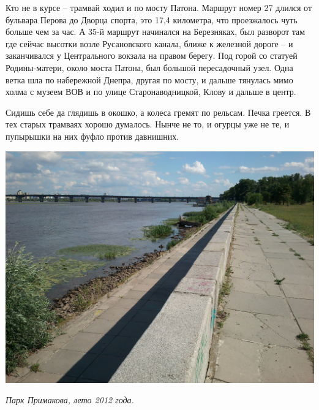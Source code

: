 Кто не в курсе – трамвай ходил и по мосту Патона. Маршрут номер 27 длился от бульвара Перова до Дворца спорта, это 17,4 километра, что проезжалось чуть больше чем за час. А 35-й маршрут начинался на Березняках, был разворот там где сейчас высотки возле Русановского канала, ближе к железной дороге – и заканчивался у Центрального вокзала на правом берегу. Под горой со статуей Родины-матери, около моста Патона, был большой пересадочный узел. Одна ветка шла по набережной Днепра, другая по мосту, и дальше тянулась мимо холма с музеем ВОВ и по улице Старонаводницкой, Клову и дальше в центр.

Сидишь себе да глядишь в окошко, а колеса гремят по рельсам. Печка греется. В тех старых трамваях хорошо думалось. Нынче не то, и огурцы уже не те, и пупырышки на них фуфло против давнишних.



\begin{center}
\includegraphics[width=\linewidth]{chast-colebanie-osnov/nachalo/primakova-01.jpg}

\textit{Парк Примакова, лето 2012 года.} 
\end{center}

